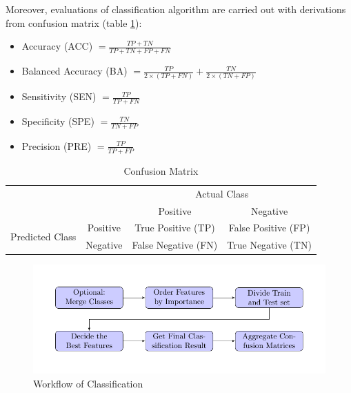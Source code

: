 \documentclass[a4paper]{article}
\begin{document}
            Moreover, evaluations of classification algorithm are carried out with derivations from confusion matrix (table \ref{tb:confusion-matrix}):

            \begin{itemize}
                \item Accuracy (ACC) $ = \frac{TP + TN}{TP + TN + FP + FN}$
                \item Balanced Accuracy (BA) $ = \frac{TP}{2 \times (TP + FN)} + \frac{TN}{2 \times (TN + FP)}$
                \item Sensitivity (SEN) $ = \frac{TP}{TP + FN}$
                \item Specificity (SPE) $ = \frac{TN}{TN + FP}$
                \item Precision (PRE) $ = \frac{TP}{TP + FP}$
            \end{itemize}

            \begin{table}[p]
                \centering
                \caption{Confusion Matrix}
                \label{tb:confusion-matrix}
                \begin{tabular}{c|c|cc}
                    \multicolumn{2}{c|}{\multirow{2}{*}{}} & \multicolumn{2}{c}{Actual Class} \\ \cline{3-4}
                    \multicolumn{2}{c|}{} & Positive & Negative \\ \hline
                    \multirow{2}{*}{Predicted Class} & Positive & True Positive (TP) & False Positive (FP) \\
                    & Negative & False Negative (FN) & True Negative (TN)
                \end{tabular}
            \end{table}

            \begin{figure}[p]
                \centering
                \includegraphics[width=0.8 \linewidth]{figures/Classifier/classifier.pdf}
                \caption{Workflow of Classification}
                \label{fig:classification}
            \end{figure}
\end{document}
